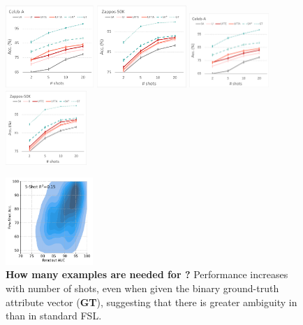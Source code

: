 \begin{figure}[t]
\savespacefigtop{-0.5in}
\centering
\begin{minipage}[b]{0.49\textwidth}
\centering
\ifarxiv
\includegraphics[height=3.1cm,trim={0.2cm 0.2cm 0.2cm 0.2cm},clip]{figures/celeb-a-nshot-v3.pdf}
\quad
\includegraphics[height=3.1cm,trim={0.2cm 0.2cm 0.2cm 0.2cm},clip]{figures/zappos-nshot-v4.pdf}
\else
\includegraphics[height=2.8cm,trim={0.2cm 0.2cm 0.2cm 0.2cm},clip]{figures/celeb-a-nshot-v3.pdf}
\quad
\includegraphics[height=2.8cm,trim={0.2cm 0.2cm 0.2cm 0.2cm},clip]{figures/zappos-nshot-v4.pdf}
\fi
\savespacebeforesection
\caption{\textbf{How many examples are needed for \taskname{}?} Performance
increases with number of shots, even when given the binary ground-truth
attribute vector (\textbf{GT}), suggesting that there is greater ambiguity in \taskname{} than in standard FSL.}
\label{fig:nshot}
\end{minipage}
\hfill
\begin{minipage}[b]{0.49\textwidth}
\centering
\ifarxiv
\includegraphics[height=3.3cm]{figures/test-s5.pdf}

\end{minipage}
\end{figure}
